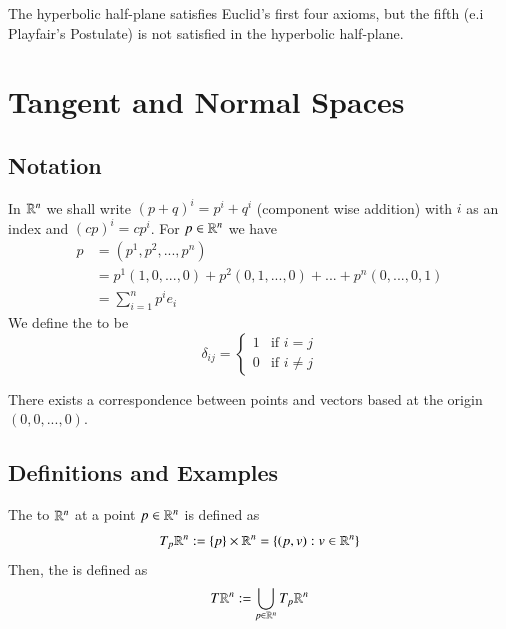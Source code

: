 \documentclass[12pt, a4paper, oneside, openright, titlepage]{book}
\begin{document}
\begin{rmk}
    The hyperbolic half-plane satisfies Euclid's first four axioms, but the fifth (e.i Playfair's Postulate) is not satisfied in the hyperbolic half-plane. 
\end{rmk}

\chapter{Tangent and Normal Spaces}

\section{Notation}

\begin{rmk}
    In $\mathbb R^n$ we shall write $(p+q)^i = p^i+q^i$ (component wise addition) with $i$ as an index and $(cp)^i = cp^i$. For $p \in \mathbb R^n$ we have\begin{align*}
        p &= (p^1,p^2,...,p^n) \\
        &=p^1(1,0,...,0) + p^2(0,1,...,0) + ... + p^n(0,...,0,1) \\
        &= \sum\limits_{i=1}^np^ie_i
    \end{align*}
    We define the  to be \begin{equation}
        \delta_{ij} = \left\{\begin{array}{ll} 1 & \text{if } i = j \\ 0 & \text{if } i \neq j \end{array}\right.
    \end{equation}
\end{rmk}

\begin{rmk}
    There exists a correspondence between points and vectors based at the origin $(0,0,...,0)$.
\end{rmk}

\section{Definitions and Examples}

\begin{defn}
    The  to $\mathbb R^n$ at a point $p \in \mathbb R^n$ is defined as \begin{equation}
        T_p\mathbb R^n :=\{p\}\times \mathbb R^n = \{(p,v):v\in\mathbb R^n\}
    \end{equation} 
    Then, the  is defined as \begin{equation}
        T\mathbb R^n := \bigcup_{p \in \mathbb R^n}T_p\mathbb R^n
    \end{equation}
\end{defn}
\end{document}
